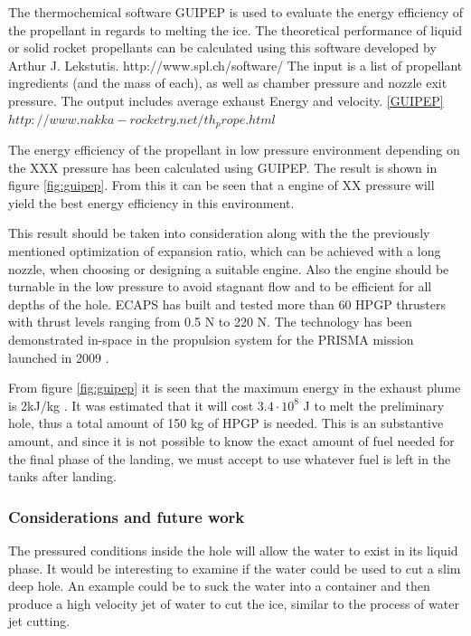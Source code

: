 The thermochemical software GUIPEP is used to evaluate the energy efficiency of the propellant in regards to melting the ice. The theoretical performance of liquid or solid rocket propellants can be calculated using this software developed by Arthur J. Lekstutis. http://www.spl.ch/software/ The input is a list of propellant ingredients (and the mass of each), as well as chamber pressure and nozzle exit pressure. The output includes average exhaust Energy and velocity. \ref{GUIPEP} $http://www.nakka-rocketry.net/th_prope.html$

The energy efficiency of the propellant in low pressure environment depending on the XXX pressure has been calculated using GUIPEP. The result is shown in figure \ref{fig:guipep}. From this it can be seen that a engine of XX pressure will yield the best energy efficiency in this environment. 

This result should be taken into consideration along with the the previously mentioned optimization of expansion ratio, which can be achieved with a long nozzle, when choosing or designing a suitable engine. Also the engine should be turnable in the low pressure to avoid stagnant flow and to be efficient for all depths of the hole. ECAPS has built and tested more than 60 HPGP thrusters with thrust levels ranging from 0.5 N to 220 N. The technology has been demonstrated in-space in the propulsion system for the PRISMA mission launched in 2009 \cite{Walter_2014}.

From figure \ref{fig:guipep} it is seen that the maximum energy in the exhaust plume is 2kJ/kg . It was estimated that it will cost $3.4 \cdot 10^8$ J to melt the preliminary hole, thus a total amount of 150 kg of HPGP is needed. This is an substantive amount, and since it is not possible to know the exact amount of fuel needed for the final phase of the landing, we must accept to use whatever fuel is left in the tanks after landing. 

\subsubsection{Considerations and future work}


The pressured conditions inside the hole will allow the water to exist in its liquid phase. It would be interesting to examine if the water could be used to cut a slim deep hole. An example could be to suck the water into a container and then produce a high velocity jet of water to cut the ice, similar to the process of water jet cutting. 

